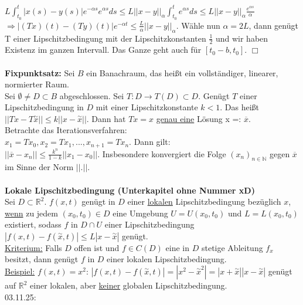 \documentclass[12pt,a4paper]{article}
\newcommand{\Lsg}{Lösung }
\begin{document}
$L \int_{t_0}^t |x(s)-y(s)|e^{-\alpha s} e^{\alpha s} ds \leq L ||x-y||_\alpha \int_{t_0}^t e^{\alpha s} ds \leq L ||x-y||_\alpha \frac{e^{\alpha s}}{\alpha}$ \\
$\Rightarrow |(Tx)(t)-(Ty)(t)|e^{-\alpha t} \leq \frac{L}{\alpha}||x-y||_\alpha$. Wähle nun $\alpha = 2L$, dann genügt T einer Lipschitzbedingung mit der Lipschitzkonstanten $\frac{1}{2}$ und wir haben Existenz im ganzen Intervall. Das Ganze geht auch für $[t_0-b,t_0]$. $\Box$
\\
\\
\textbf{Fixpunktsatz:}
Sei $B$ ein Banachraum, das heißt ein vollständiger, linearer, normierter Raum. \\
Sei $\emptyset \neq D \subset B$ abgeschlossen. Sei $T:D \rightarrow T(D) \subset D$. Genügt $T$ einer Lipschitzbedingung in $D$ mit einer Lipschitzkonstante $k < 1$. Das heißt $||Tx-T\overset{\sim}{x}|| \leq k ||x-\overset{\sim}{x}||$. Dann hat $Tx=x$ \underline{genau eine} \Lsg x =: $\overline{x}$. \\
Betrachte das Iterationsverfahren: \\
$x_1=Tx_0, x_2=Tx_1, ..., x_{n+1}=Tx_n$. Dann gilt: \\
$||\overline{x}-x_n||\leq \frac{k^n}{1-k}||x_1-x_0||$. Insbesondere konvergiert die Folge $(x_n)_{n \in \mathbb{N}}$ gegen $\overline{x}$ im Sinne der Norm $||.||$.
\\
\\
\textbf{Lokale Lipschitzbedingung (Unterkapitel ohne Nummer xD)} \\
Sei $D \subset \mathbb{R}^2.$ $f(x,t)$ genügt in $D$ einer \underline{lokalen} Lipschitzbedingung bezüglich $x$, \underline{wenn} zu jedem $(x_0, t_0) \in D$ eine Umgebung $U=U(x_0, t_0)$ und $L=L(x_0, t_0)$ existiert, sodass $f$ in $D \cap U$ einer Lipschitzbedingung $|f(x,t)-f(\overset{\sim}{x},t)| \leq L |x-\overset{\sim}{x}|$ genügt. \\
\underline{Kriterium:} Falls $D$ offen ist und $f \in C(D)$ eine in $D$ stetige Ableitung $f_x$ besitzt, dann genügt $f$ in $D$ einer lokalen Lipschitzbedingung. \\
\underline{Beispiel:} $f(x,t) = x^2$: $|f(x,t)-f(\overset{\sim}{x},t)| = |x^2 - \overset{\sim}{x}^2| = |x+\overset{\sim}{x}||x-\overset{\sim}{x}|$ genügt auf $\mathbb{R}^2$ einer lokalen, aber \underline{keiner} globalen Lipschitzbedingung.
\\
03.11.25:



 
\end{document}

